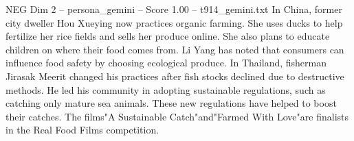 \begin{textsample}{NEG Dim 2 – persona\_gemini – Score 1.00 – t914\_gemini.txt}  \label{ex:f2_neg_004}
In China, former city dweller Hou Xueying now practices organic farming.
She uses ducks to help fertilize her rice fields and sells her produce online.
She also plans to educate children on where their food comes from.
Li Yang has noted that consumers can influence food safety by choosing ecological produce.
In Thailand, fisherman Jirasak Meerit changed his practices after fish stocks declined due to destructive methods.
He led his community in adopting sustainable regulations, such as catching only mature sea animals.
These new regulations have helped to boost their catches.
The films"A Sustainable Catch"and"Farmed With Love"are finalists in the Real Food Films competition.

\end{textsample}
